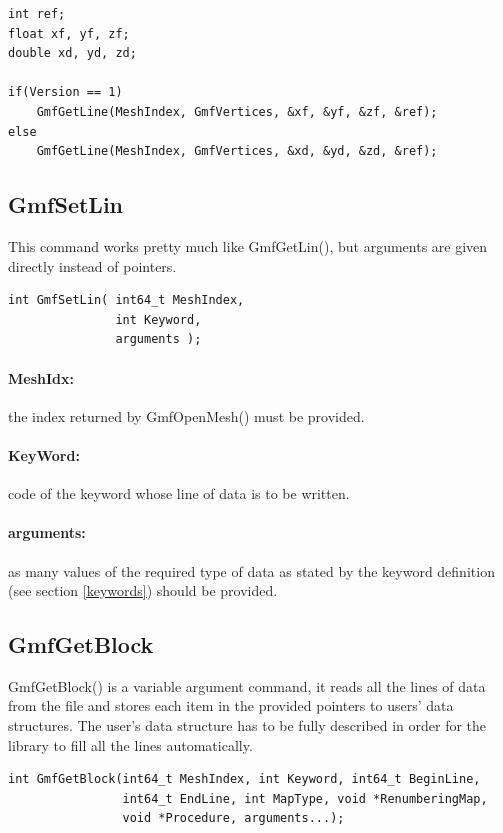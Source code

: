 \documentclass[a4paper,12pt]{article}
\begin{document}
\begin{tt}
\begin{verbatim}
int ref;
float xf, yf, zf;
double xd, yd, zd;

if(Version == 1)
    GmfGetLine(MeshIndex, GmfVertices, &xf, &yf, &zf, &ref);
else
    GmfGetLine(MeshIndex, GmfVertices, &xd, &yd, &zd, &ref);
\end{verbatim}
\end{tt}
\normalfont


\subsection{GmfSetLin}
This command works pretty much like GmfGetLin(), but arguments are given directly instead of pointers.

\begin{tt}
\begin{verbatim}
int GmfSetLin( int64_t MeshIndex,
               int Keyword,
               arguments );
\end{verbatim}
\end{tt}
\normalfont

\paragraph{MeshIdx:}
the index returned by GmfOpenMesh() must be provided.

\paragraph{KeyWord:} code of the keyword whose line of data is to be written.

\paragraph{arguments:} as many values of the required type of data as stated by the keyword definition (see section \ref{keywords}) should be provided.


\subsection{GmfGetBlock}
GmfGetBlock() is a variable argument command, it reads all the lines of data from the file and stores each item in the provided pointers to users' data structures. The user's data structure has to be fully described in order for the library to fill all the lines automatically.

\begin{tt}
\begin{verbatim}
int GmfGetBlock(int64_t MeshIndex, int Keyword, int64_t BeginLine, 
                int64_t EndLine, int MapType, void *RenumberingMap,
                void *Procedure, arguments...);
\end{verbatim}
\end{tt}
\normalfont
\end{document}
